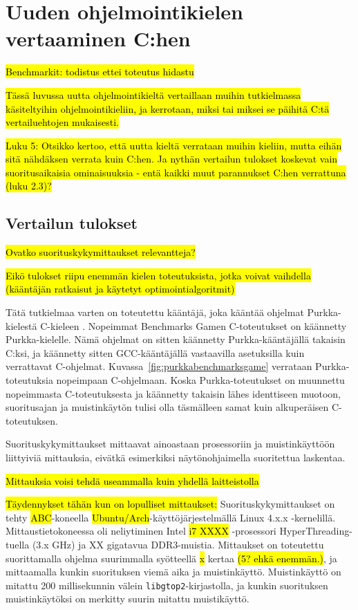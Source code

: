 \section{Uuden ohjelmointikielen vertaaminen C:hen}

\hl{Benchmarkit: todistus ettei toteutus hidastu}

\hl{Tässä luvussa uutta ohjelmointikieltä vertaillaan muihin tutkielmassa
käsiteltyihin ohjelmointikieliin, ja kerrotaan, miksi tai miksei se päihitä
C:tä vertailuehtojen mukaisesti.}

\hl{ Luku 5: Otsikko kertoo, että uutta kieltä verrataan muihin kieliin, mutta
eihän sitä nähdäksen verrata kuin C:hen. Ja nythän vertailun tulokset koskevat
vain suoritusaikaisia ominaisuuksia - entä kaikki muut parannukset C:hen
verrattuna (luku 2.3)? }

\subsection{Vertailun tulokset}
\label{sec:results}

\hl{Ovatko suorituskykymittaukset relevantteja?}

\hl{Eikö tulokset riipu enemmän kielen toteutuksista, jotka voivat vaihdella
(kääntäjän ratkaisut ja käytetyt optimointialgoritmit)}

Tätä tutkielmaa varten on toteutettu kääntäjä, joka kääntää ohjelmat
Purkka-kielestä C-kieleen \citep{purkka}. Nopeimmat Benchmarks Gamen
C-toteutukset on käännetty Purkka-kielelle. Nämä ohjelmat on sitten käännetty
Purkka-kääntäjällä takaisin C:ksi, ja käännetty sitten GCC-kääntäjällä
vastaavilla asetuksilla kuin verrattavat C-ohjelmat.
Kuvassa~\ref{fig:purkkabenchmarksgame} verrataan Purkka-toteutuksia nopeimpaan
C-ohjelmaan. Koska Purkka-toteutukset on muunnettu nopeimmasta C-toteutuksesta
ja käännetty takaisin lähes identtiseen muotoon, suoritusajan ja muistinkäytön
tulisi olla täsmälleen samat kuin alkuperäisen C-toteutuksen.

Suorituskykymittaukset mittaavat ainoastaan prosessoriin ja muistinkäyttöön
liittyiviä mittauksia, eivätkä esimerkiksi näytönohjaimella suoritettua
laskentaa.

\hl{Mittauksia voisi tehdä useammalla kuin yhdellä laitteistolla}

\hl{Täydennykset tähän kun on lopulliset mittaukset: } Suorituskykymittaukset
on tehty \hl{ABC}-koneella \hl{Ubuntu/Arch}-käyttöjärjestelmällä Linux 4.x.x
-kernelillä. Mittaustietokoneessa oli neliytiminen Intel \hl{i7 XXXX}
-prosessori HyperThreading-tuella (3.x GHz) ja XX gigatavua DDR3-muistia.
Mittaukset on toteutettu suorittamalla ohjelma suurimmalla syötteellä \hl{x}
kertaa \hl{(5? ehkä enemmän.)}, ja mittaamalla kunkin suorituksen viemä aika ja
muistinkäyttö. Muistinkäyttö on mitattu 200 millisekunnin välein
\texttt{libgtop2}-kirjastolla, ja kunkin suorituksen muistinkäytöksi on merkitty
suurin mitattu muistikäyttö.

